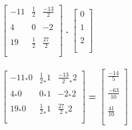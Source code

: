 \documentclass{article}
\begin{document}
\begin{hbox}{

$\left[
\begin{array} {rrr}
-11 & \frac{1}{2} & \frac{-13}{2}\\\\
4 & 0 & -2\\\\
19 & \frac{1}{2} & \frac{27}{2}\\\\
\end{array}
\right]
$
\textbf{.}
$\left[
\begin{array} {c}
0\\\\
1\\\\
2\\\\
\end{array}
\right]
$
\\\rightarrow\\
$\left[
\begin{array} {rrr}
-11_*0 & \frac{1}{2}_*1 & \frac{-13}{2}_*2\\\\
4_*0 & 0_*1 & -2_*2\\\\
19_*0 & \frac{1}{2}_*1 & \frac{27}{2}_*2\\\\
\end{array}
\right]
$
\textbf{=}
$\left[
\begin{array} {c}
\frac{-14}{5}\\\\
\frac{-63}{10}\\\\
\frac{41}{10}\\\\
\end{array}
\right]
$}
\end{hbox}
\end{document}
